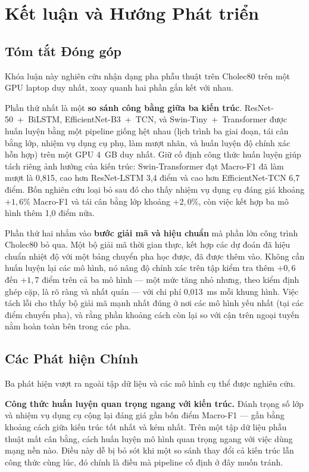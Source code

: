 \chapter{Kết luận và Hướng Phát triển}

\section{Tóm tắt Đóng góp}

Khóa luận này nghiên cứu nhận dạng pha phẫu thuật trên Cholec80 trên một GPU laptop duy nhất, xoay quanh hai phần gắn kết với nhau.

Phần thứ nhất là một \textbf{so sánh công bằng giữa ba kiến trúc}. ResNet-50~+~BiLSTM, EfficientNet-B3~+~TCN, và Swin-Tiny~+~Transformer được huấn luyện bằng một pipeline giống hệt nhau (lịch trình ba giai đoạn, tái cân bằng lớp, nhiệm vụ dụng cụ phụ, làm mượt nhãn, và huấn luyện độ chính xác hỗn hợp) trên một GPU 4~GB duy nhất. Giữ cố định công thức huấn luyện giúp tách riêng ảnh hưởng của kiến trúc: Swin-Transformer đạt Macro-F1 đã làm mượt là 0,815, cao hơn ResNet-LSTM 3,4 điểm và cao hơn EfficientNet-TCN 6,7 điểm. Bốn nghiên cứu loại bỏ sau đó cho thấy nhiệm vụ dụng cụ đáng giá khoảng $+1{,}6\%$ Macro-F1 và tái cân bằng lớp khoảng $+2{,}0\%$, còn việc kết hợp ba mô hình thêm 1,0 điểm nữa.

Phần thứ hai nhắm vào \textbf{bước giải mã và hiệu chuẩn} mà phần lớn công trình Cholec80 bỏ qua. Một bộ giải mã thời gian thực, kết hợp các dự đoán đã hiệu chuẩn nhiệt độ với một bảng chuyển pha học được, đã được thêm vào. Không cần huấn luyện lại các mô hình, nó nâng độ chính xác trên tập kiểm tra thêm $+0{,}6$ đến $+1{,}7$ điểm trên cả ba mô hình --- một mức tăng nhỏ nhưng, theo kiểm định ghép cặp, là rõ ràng và nhất quán --- với chi phí 0,013~ms mỗi khung hình. Việc tách lỗi cho thấy bộ giải mã mạnh nhất đúng ở nơi các mô hình yếu nhất (tại các điểm chuyển pha), và rằng phần khoảng cách còn lại so với cận trên ngoại tuyến nằm hoàn toàn bên trong các pha.

\section{Các Phát hiện Chính}

Ba phát hiện vượt ra ngoài tập dữ liệu và các mô hình cụ thể được nghiên cứu.

\textbf{Công thức huấn luyện quan trọng ngang với kiến trúc.} Đánh trọng số lớp và nhiệm vụ dụng cụ cộng lại đáng giá gần bốn điểm Macro-F1 --- gần bằng khoảng cách giữa kiến trúc tốt nhất và kém nhất. Trên một tập dữ liệu phẫu thuật mất cân bằng, cách huấn luyện mô hình quan trọng ngang với việc dùng mạng nền nào. Điều này dễ bị bỏ sót khi một so sánh thay đổi cả kiến trúc lẫn công thức cùng lúc, đó chính là điều mà pipeline cố định ở đây muốn tránh.

